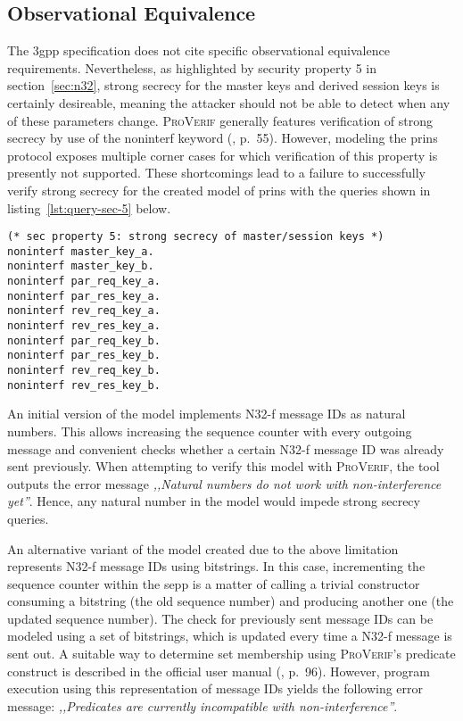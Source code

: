 \subsection{Observational Equivalence}
\label{ssec:equivalence}

The \gls{3gpp} specification does not cite specific observational equivalence requirements.
Nevertheless, as highlighted by security property 5 in section~\ref{sec:n32}, strong secrecy for the master keys and derived session keys is certainly desireable, meaning the attacker should not be able to detect when any of these parameters change.
\textsc{ProVerif} generally features verification of strong secrecy by use of the {\sffamily noninterf} keyword (\cite{blanchet2020proverif}, p.~55).
However, modeling the \gls{prins} protocol exposes multiple corner cases for which verification of this property is presently not supported.
These shortcomings lead to a failure to successfully verify strong secrecy for the created model of \gls{prins} with the queries shown in listing~\ref{lst:query-sec-5} below.

\begin{lstlisting}[caption={Query for security property 5},label={lst:query-sec-5},firstnumber=432]
(* sec property 5: strong secrecy of master/session keys *)
noninterf master_key_a.
noninterf master_key_b.
noninterf par_req_key_a.
noninterf par_res_key_a.
noninterf rev_req_key_a.
noninterf rev_res_key_a.
noninterf par_req_key_b.
noninterf par_res_key_b.
noninterf rev_req_key_b.
noninterf rev_res_key_b.
\end{lstlisting}

An initial version of the model implements N32-f message IDs as natural numbers.
This allows increasing the sequence counter with every outgoing message and convenient checks whether a certain N32-f message ID was already sent previously.
When attempting to verify this model with \textsc{ProVerif}, the tool outputs the error message \textit{,,Natural numbers do not work with non-interference yet''}.
Hence, any natural number in the model would impede strong secrecy queries.

An alternative variant of the model created due to the above limitation represents N32-f message IDs using bitstrings.
In this case, incrementing the sequence counter within the \gls{sepp} is a matter of calling a trivial constructor consuming a bitstring (the old sequence number) and producing another one (the updated sequence number).
The check for previously sent message IDs can be modeled using a set of bitstrings, which is updated every time a N32-f message is sent out.
A suitable way to determine set membership using \textsc{ProVerif}'s {\sffamily predicate} construct is described in the official user manual (\cite{blanchet2020proverif}, p.~96).
However, program execution using this representation of message IDs yields the following error message: \textit{,,Predicates are currently incompatible with non-interference''}.

